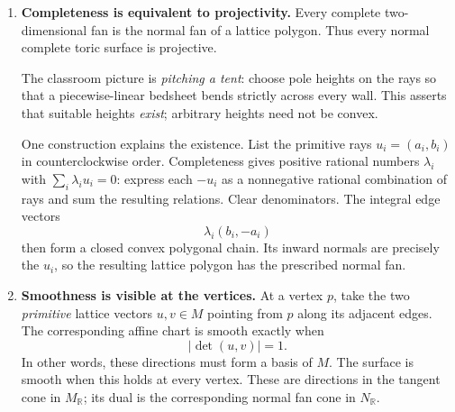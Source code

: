 \documentclass[11pt]{article}
\theoremstyle{definition}
\theoremstyle{remark}
\newcommand{\bR}{\mathbb{R}}
\begin{document}
\begin{enumerate}
    \item \textbf{Completeness is equivalent to projectivity.}
    Every complete two-dimensional fan is the normal fan of a lattice
    polygon. Thus every normal complete toric surface is projective.

    The classroom picture is \emph{pitching a tent}: choose pole heights
    on the rays so that a piecewise-linear bedsheet bends strictly
    across every wall. This asserts that suitable heights
    \emph{exist}; arbitrary heights need not be convex.

    One construction explains the existence. List the primitive rays
    \(u_i=(a_i,b_i)\) in counterclockwise order. Completeness gives
    positive rational numbers \(\lambda_i\) with
    \(\sum_i\lambda_i u_i=0\): express each \(-u_i\) as a nonnegative
    rational combination of rays and sum the resulting relations.
    Clear denominators. The integral edge vectors
    \[
        \lambda_i(b_i,-a_i)
    \]
    then form a closed convex polygonal chain. Its inward normals
    are precisely the \(u_i\), so the resulting lattice polygon has
    the prescribed normal fan.

    \item \textbf{Smoothness is visible at the vertices.}
    At a vertex \(p\), take the two \emph{primitive} lattice vectors
    \(u,v\in M\) pointing from \(p\) along its adjacent edges. The
    corresponding affine chart is smooth exactly when
    \[
        |\det(u,v)|=1.
    \]
    In other words, these directions must form a basis of \(M\).
    The surface is smooth when this holds at every vertex.
    These are directions in the tangent cone in \(M_\bR\); its dual
    is the corresponding normal fan cone in \(N_\bR\).


\end{enumerate}
\end{document}
